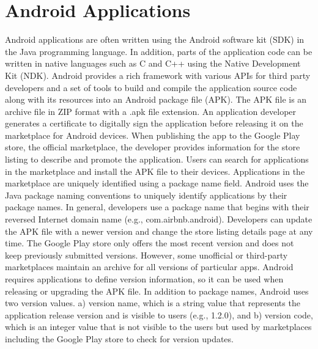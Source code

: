 \section{Android Applications}
Android applications are often written using the Android software kit (SDK) in the Java programming language.
In addition, parts of the application code can be written in native languages such as C and C++ using the Native Development Kit (NDK).
Android provides a rich framework with various APIs for third party developers and a set of tools to build and compile the application source code along with its resources into an Android package file (APK).
The APK file is an archive file in ZIP format with a .apk file extension.
An application developer generates a certificate to digitally sign the application before releasing it on the marketplace for Android devices.
When publishing the app to the Google Play store, the official marketplace, the developer provides information for the store listing to describe and promote the application.
Users can search for applications in the marketplace and install the APK file to their devices.
Applications in the marketplace are uniquely identified using a package name field.
Android uses the Java package naming conventions to uniquely identify applications by their package names.
In general, developers use a package name that begins with their reversed Internet domain name (e.g., com.airbnb.android).
Developers can update the APK file with a newer version and change the store listing details page at any time.
The Google Play store only offers the most recent version and does not keep previously submitted versions.
However, some unofficial or third-party marketplaces maintain an archive for all versions of particular apps.
Android requires applications to define version information, so it can be used when releasing or upgrading the APK file.
In addition to package names, Android uses two version values. 
a) version name, which is a string value that represents the application release version and is visible to users (e.g., 1.2.0), and b) version code, which is an integer value that is not visible to the users but used by marketplaces including the Google Play store to check for version updates.

